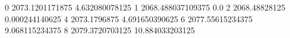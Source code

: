 0 2073.1201171875 4.632080078125
1 2068.488037109375 0.0
2 2068.48828125 0.000244140625
4 2073.1796875 4.691650390625
6 2077.55615234375 9.068115234375
8 2079.3720703125 10.884033203125
